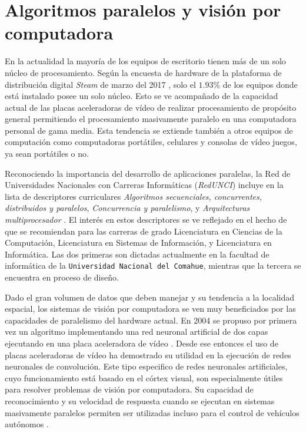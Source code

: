 
\section{Algoritmos paralelos y visión por computadora}

\label{algoritmosParalelosYVision}

En la actualidad la mayoría de los equipos de escritorio tienen más de un solo
núcleo de procesamiento. Según la encuesta de hardware de la plataforma de
distribución digital \emph{Steam} de marzo del 2017 \cite{steamSurvey}, solo
el $1.93$\% de los equipos donde está instalado posee un solo núcleo. Esto se
ve acompañado de la capacidad actual de las placas aceleradoras de vídeo de
realizar procesamiento de propósito general permitiendo el procesamiento
masivamente paralelo en una computadora personal de gama media. Esta tendencia
se extiende también a otros equipos de computación como computadoras
portátiles, celulares y consolas de vídeo juegos, ya sean portátiles o no.

Reconociendo la importancia del desarrollo de aplicaciones paralelas, la Red
de Universidades Nacionales con Carreras Informáticas (\emph{RedUNCI}) incluye
en la lista de descriptores curriculares \emph{Algoritmos secuenciales,
concurrentes, distribuidos y paralelos}, \emph{Concurrencia y paralelismo}, y
\emph{Arquitecturas multiprocesador} \cite{RedUNCI2015}. El interés en estos
descriptores se ve reflejado en el hecho de que se recomiendan para las
carreras de grado Licenciatura en Ciencias de la Computación, Licenciatura en
Sistemas de Información, y Licenciatura en Informática. Las dos primeras son
dictadas actualmente en la facultad de informática de la \texttt{Universidad
Nacional del Comahue}, mientras que la tercera se encuentra en proceso de
diseño.

Dado el gran volumen de datos que deben manejar y su tendencia a la localidad
espacial, los sistemas de visión por computadora se ven muy beneficiados por
las capacidades de paralelismo del hardware actual. En 2004 se propuso por
primera vez un algoritmo implementando una red neuronal artificial de dos
capas ejecutando en una placa aceleradora de vídeo \cite{GPUforMLA}. Desde ese
entonces el uso de placas aceleradoras de vídeo ha demostrado su utilidad en la
ejecución de redes neuronales de convolución. Este tipo especifico de redes
neuronales artificiales, cuyo funcionamiento está basado en el córtex visual,
son especialmente útiles para resolver problemas de visión por computadora. Su
capacidad de reconocimiento y su velocidad de respuesta cuando se ejecutan en
sistemas masivamente paralelos permiten ser utilizadas incluso para el control
de vehículos autónomos \cite{e2eLearning4SDC}.

